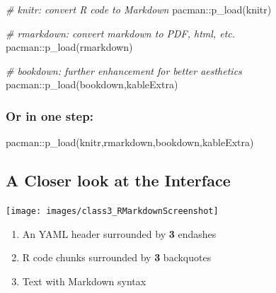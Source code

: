 \documentclass[
  11pt,
]{book}
\newenvironment{Shaded}{\begin{snugshade}}{\end{snugshade}}
\newcommand{\CommentTok}[1]{\textcolor[rgb]{0.56,0.35,0.01}{\textit{#1}}}
\newcommand{\FunctionTok}[1]{\textcolor[rgb]{0.00,0.00,0.00}{#1}}
\newcommand{\NormalTok}[1]{#1}
\newcommand{\SpecialCharTok}[1]{\textcolor[rgb]{0.00,0.00,0.00}{#1}}
\providecommand{\tightlist}{%
  \setlength{\itemsep}{0pt}\setlength{\parskip}{0pt}}
\begin{document}
\begin{Shaded}
\begin{Highlighting}[]
\CommentTok{\# \textasciigrave{}knitr\textasciigrave{}: convert R code to Markdown}
\NormalTok{pacman}\SpecialCharTok{::}\FunctionTok{p\_load}\NormalTok{(knitr)}

\CommentTok{\# \textasciigrave{}rmarkdown\textasciigrave{}: convert markdown to PDF, html, etc.}
\NormalTok{pacman}\SpecialCharTok{::}\FunctionTok{p\_load}\NormalTok{(rmarkdown)}

\CommentTok{\# \textasciigrave{}bookdown\textasciigrave{}: further enhancement for better aesthetics}
\NormalTok{pacman}\SpecialCharTok{::}\FunctionTok{p\_load}\NormalTok{(bookdown,kableExtra)}
\end{Highlighting}
\end{Shaded}

\hypertarget{or-in-one-step}{%
\subsubsection{Or in one step:}\label{or-in-one-step}}

\begin{Shaded}
\begin{Highlighting}[]
\NormalTok{pacman}\SpecialCharTok{::}\FunctionTok{p\_load}\NormalTok{(knitr,rmarkdown,bookdown,kableExtra)}
\end{Highlighting}
\end{Shaded}

\hypertarget{a-closer-look-at-the-interface}{%
\subsection{A Closer look at the Interface}\label{a-closer-look-at-the-interface}}

\begin{center}\texttt{[image: images/class3\_RMarkdownScreenshot]} \end{center}

\small

\begin{enumerate}
\def\labelenumi{\arabic{enumi}.}
\tightlist
\item
  An YAML header surrounded by \textbf{3} endashes
\item
  R code chunks surrounded by \textbf{3} backquotes
\item
  Text with Markdown syntax
\end{enumerate}
\end{document}

